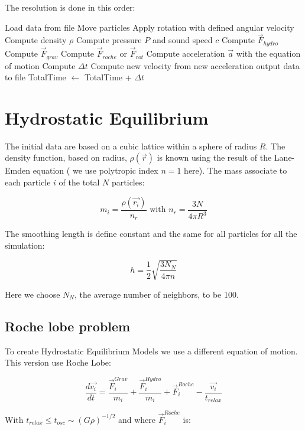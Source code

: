 \documentclass{article}
\begin{document}
The resolution is done in this order:\\

\begin{algorithmic}
\State Load data from file
\State Move particles
\State Apply rotation with defined angular velocity
\State Compute density $\rho$
\State Compute pressure $P$ and sound speed $c$
\State Compute $\vec{F}_{hydro}$
\State Compute $\vec{F}_{grav}$
\State Compute $\vec{F}_{roche}$ or $\vec{F}_{rot}$
\EndIf
\State Compute acceleration $\vec{a}$ with the equation of motion
\State Compute $\Delta t$
\State Compute new velocity from new acceleration
\State output data to file
\EndIf
\State TotalTime $\leftarrow$ TotalTime + $\Delta t$
\EndWhile
\end{algorithmic}

\section{Hydrostatic Equilibrium}
\label{sec:equi}

The initial data are based on a cubic lattice within a sphere of radius $R$.
The density function, based on radius, $\rho(\vec{r})$ is known using the result of the Lane-Emden equation ( we use polytropic index $n = 1$ here).
The mass associate to each particle $i$ of the total $N$ particles:

$$ m_i = \frac{\rho(\vec{r_i})}{n_r} \mbox{ with } n_r = \frac{3N}{4 \pi R^3}$$

The smoothing length is define constant and the same for all particles for all the simulation:

$$ h = \frac{1}{2}\sqrt{\frac{3N_N}{4\pi n}} $$

Here we choose $N_N$, the average number of neighbors, to be 100.

\subsection{Roche lobe problem}

To create Hydrostatic Equilibrium Models we use a different equation of motion. This version use Roche Lobe:

\begin{equation}
\frac{d\vec{v_i}}{dt} = \frac{\vec{F}_i^{Grav}}{m_i} + \frac{\vec{F}_i^{Hydro}}{m_i} + \vec{F}_i^{Roche} - \frac{\vec{v_i}}{t_{relax}}
\end{equation}


With $t_{relax} \leq t_{osc} \sim (G\rho)^{-1/2}$ and
where $\vec{F}_i^{Roche}$ is:
\end{document}
